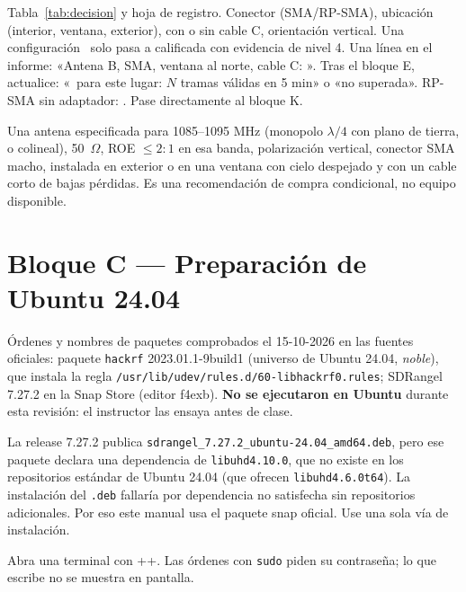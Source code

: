 {Tabla~\ref{tab:decision} y hoja de registro.}
{Conector (SMA/RP-SMA), ubicación (interior, ventana, exterior), con o sin cable C, orientación vertical.}
{Una configuración \COND\ solo pasa a calificada con evidencia de nivel 4.}
{Una línea en el informe: «Antena B, SMA, ventana al norte, cable C: \COND».}
{Tras el bloque E, actualice: «\PASS\ para este lugar: $N$ tramas válidas en 5 min» o «no superada».}
{RP-SMA sin adaptador: \BLOQ. Pase directamente al bloque K.}

\begin{nota}
Una antena especificada para 1085--1095 MHz (monopolo $\lambda/4$ con plano de tierra, o colineal), 50~$\Omega$, ROE $\le 2{:}1$ en esa banda, polarización vertical, conector SMA macho, instalada en exterior o en una ventana con cielo despejado y con un cable corto de bajas pérdidas. Es una recomendación de compra condicional, no equipo disponible.
\end{nota}

\section{Bloque C --- Preparación de Ubuntu 24.04}
\label{sec:u-ubuntu}

\begin{estado}
Órdenes y nombres de paquetes comprobados el 15-10-2026 en las fuentes oficiales: paquete \texttt{hackrf} 2023.01.1-9build1 (universo de Ubuntu 24.04, \emph{noble}), que instala la regla \texttt{/usr/lib/udev/rules.d/60-libhackrf0.rules}; SDRangel 7.27.2 en la Snap Store (editor f4exb). \textbf{No se ejecutaron en Ubuntu} durante esta revisión: el instructor las ensaya antes de clase.
\end{estado}

\begin{importante}
La release 7.27.2 publica \texttt{sdrangel\_7.27.2\_ubuntu-24.04\_amd64.deb}, pero ese paquete declara una dependencia de \texttt{libuhd4.10.0}, que no existe en los repositorios estándar de Ubuntu 24.04 (que ofrecen \texttt{libuhd4.6.0t64}). La instalación del \texttt{.deb} fallaría por dependencia no satisfecha sin repositorios adicionales. Por eso este manual usa el paquete snap oficial. Use una sola vía de instalación.
\end{importante}

Abra una terminal con ++. Las órdenes con \texttt{sudo} piden su contraseña; lo que escribe no se muestra en pantalla.

